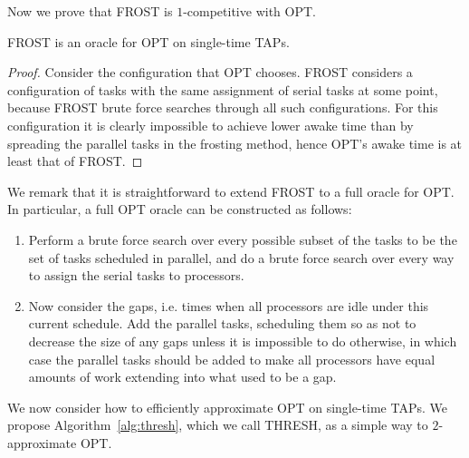 Now we prove that FROST is $1$-competitive with OPT.
\begin{lemma}
  \label{lem:frosting} 
  FROST is an oracle for OPT on single-time TAPs.
\end{lemma}
\begin{proof}
  Consider the configuration that OPT chooses. FROST considers
  a configuration of tasks with the same assignment of serial
  tasks at some point, because FROST brute force searches through
  all such configurations. For this configuration it is clearly
  impossible to achieve lower awake time than by spreading the
  parallel tasks in the frosting method, hence OPT's awake time
  is at least that of FROST.
\end{proof}

We remark that it is straightforward to extend FROST to a full
oracle for OPT. In particular, a full OPT oracle can be
constructed as follows: 

\begin{enumerate}
  \item Perform a brute force search over every
possible subset of the tasks to be the set of tasks scheduled in
parallel, and do a brute force search over every way to assign
the serial tasks to processors. 

\item Now consider the gaps, i.e. times
when all processors are idle under this current schedule. Add the
parallel tasks, scheduling them so as not to decrease the size of
any gaps unless it is impossible to do otherwise, in which case
the parallel tasks should be added to make all processors have
equal amounts of work extending into what used to be a gap.
\end{enumerate}

We now consider how to efficiently approximate OPT on
single-time TAPs. We propose Algorithm~\ref{alg:thresh}, which we
call THRESH, as a simple way to $2$-approximate OPT.


